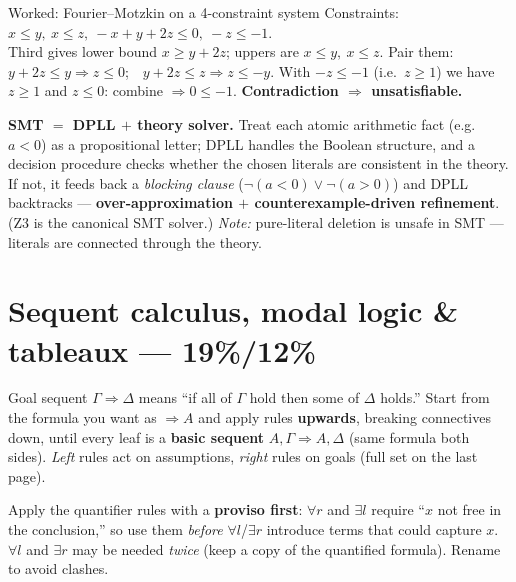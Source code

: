 \documentclass[11pt,a4paper]{article}
\newcommand{\seq}{\Rightarrow}
\begin{document}
\begin{plain}{Worked: Fourier--Motzkin on a 4-constraint system}
Constraints: $x\le y,\ x\le z,\ -x+y+2z\le 0,\ -z\le -1$.\\
Third gives lower bound $x\ge y+2z$; uppers are $x\le y,\ x\le z$. Pair them:
$y+2z\le y\Rightarrow z\le 0$;\ \ $y+2z\le z\Rightarrow z\le -y$. With $-z\le-1$ (i.e.\ $z\ge1$) we have $z\ge1$ and $z\le0$: combine $\Rightarrow 0\le -1$. \textbf{Contradiction $\Rightarrow$ unsatisfiable.}
\end{plain}

\begin{useful}
\textbf{SMT $=$ DPLL $+$ theory solver.} Treat each atomic arithmetic fact (e.g.\ $a<0$) as a propositional letter; DPLL handles the Boolean structure, and a decision procedure checks whether the chosen literals are consistent in the theory. If not, it feeds back a \emph{blocking clause} ($\neg(a<0)\vee\neg(a>0)$) and DPLL backtracks --- \textbf{over-approximation $+$ counterexample-driven refinement}. (Z3 is the canonical SMT solver.) \emph{Note:} pure-literal deletion is unsafe in SMT --- literals are connected through the theory.
\end{useful}

\section{Sequent calculus, modal logic \& tableaux --- 19\%/12\%}

\begin{must}[title=How to do a sequent proof (work backwards)]
Goal sequent $\Gamma\seq\Delta$ means ``if all of $\Gamma$ hold then some of $\Delta$ holds.'' Start from the formula you want as $\seq A$ and apply rules \textbf{upwards}, breaking connectives down, until every leaf is a \textbf{basic sequent} $A,\Gamma\seq A,\Delta$ (same formula both sides). \emph{Left} rules act on assumptions, \emph{right} rules on goals (full set on the last page).
\end{must}

\begin{gotcha}
Apply the quantifier rules with a \textbf{proviso first}: $\forall r$ and $\exists l$ require ``$x$ not free in the conclusion,'' so use them \emph{before} $\forall l$/$\exists r$ introduce terms that could capture $x$. $\forall l$ and $\exists r$ may be needed \emph{twice} (keep a copy of the quantified formula). Rename to avoid clashes.
\end{gotcha}
\end{document}
